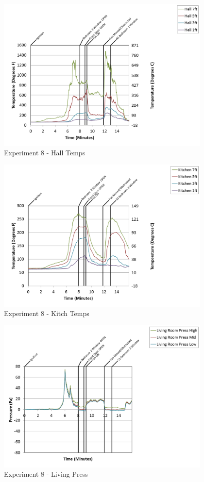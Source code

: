 \documentclass{article}
\begin{document}
\begin{appendices}
\clearpage

\begin{figure}[h!]
	\centering
	\includegraphics[height=3.05in]{0_Images/Results_Charts/Exp_8_Charts/HallTemps.png}
	\caption{Experiment 8 - Hall Temps}
\end{figure}


\begin{figure}[h!]
	\centering
	\includegraphics[height=3.05in]{0_Images/Results_Charts/Exp_8_Charts/KitchTemps.png}
	\caption{Experiment 8 - Kitch Temps}
\end{figure}

\clearpage

\begin{figure}[h!]
	\centering
	\includegraphics[height=3.05in]{0_Images/Results_Charts/Exp_8_Charts/LivingPress.png}
	\caption{Experiment 8 - Living Press}
\end{figure}



\end{appendices}
\end{document}
